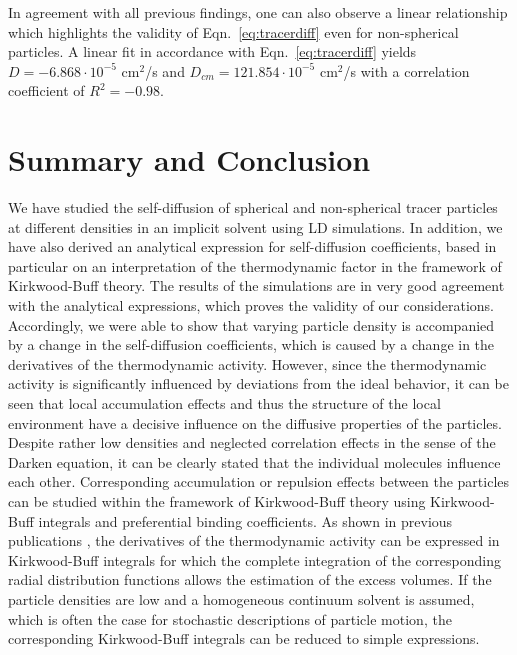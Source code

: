 \documentclass[aip,jcp,reprint]{revtex4-1}
\begin{document}
In agreement with all previous findings, one can also observe a linear relationship which highlights the validity of Eqn.~\eqref{eq:tracerdiff} even for non-spherical particles. A linear fit in accordance with Eqn.~\eqref{eq:tracerdiff} yields $D=-6.868\cdot 10^{-5}$ cm$^2$/s and $D_{cm}=121.854 \cdot 10^{-5}$ cm$^2$/s with a correlation coefficient  of $R^2 = -0.98$.

 

\section{Summary and Conclusion}
We have studied the self-diffusion of spherical and non-spherical tracer particles at different densities in an implicit solvent using LD simulations. In addition, we have also derived an analytical expression for self-diffusion coefficients, based in particular on an interpretation of the thermodynamic factor in the framework of Kirkwood-Buff theory. The results of the simulations are in very good agreement with the analytical expressions, which proves the validity of our considerations. Accordingly, we were able to show that varying particle density is accompanied by a change in the self-diffusion coefficients, which is caused by a change in the derivatives of the thermodynamic activity. However, since the thermodynamic activity is significantly influenced by deviations from the ideal behavior, it can be seen that local accumulation effects and thus the structure of the local environment have a decisive influence on the diffusive properties of the particles. \\
Despite rather low densities and neglected correlation effects in the sense of the Darken equation, it can be clearly stated that the individual molecules influence each other. 
Corresponding accumulation or repulsion effects between the particles can be studied within the framework of Kirkwood-Buff theory \cite{kirkwood51} using Kirkwood-Buff integrals and preferential binding coefficients. As shown in previous publications \cite{ben13a,smith06,smiatek17a}, the derivatives of the thermodynamic activity can be expressed in Kirkwood-Buff integrals for which the complete integration of the corresponding radial distribution functions allows the estimation of the excess volumes. If the particle densities are low and a homogeneous continuum solvent is assumed, which is often the case for stochastic descriptions of particle motion, the corresponding Kirkwood-Buff integrals can be reduced to simple expressions. \\
\end{document}
